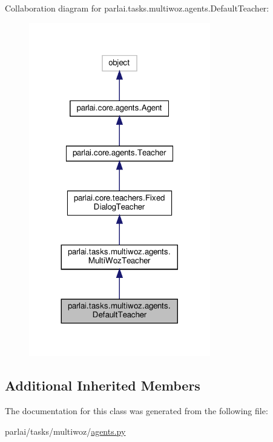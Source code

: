 Collaboration diagram for parlai.\+tasks.\+multiwoz.\+agents.\+Default\+Teacher\+:
\nopagebreak
\begin{figure}[H]
\begin{center}
\leavevmode
\includegraphics[width=224pt]{classparlai_1_1tasks_1_1multiwoz_1_1agents_1_1DefaultTeacher__coll__graph}
\end{center}
\end{figure}
\subsection*{Additional Inherited Members}


The documentation for this class was generated from the following file\+:\begin{DoxyCompactItemize}
\item 
parlai/tasks/multiwoz/\hyperlink{parlai_2tasks_2multiwoz_2agents_8py}{agents.\+py}\end{DoxyCompactItemize}
